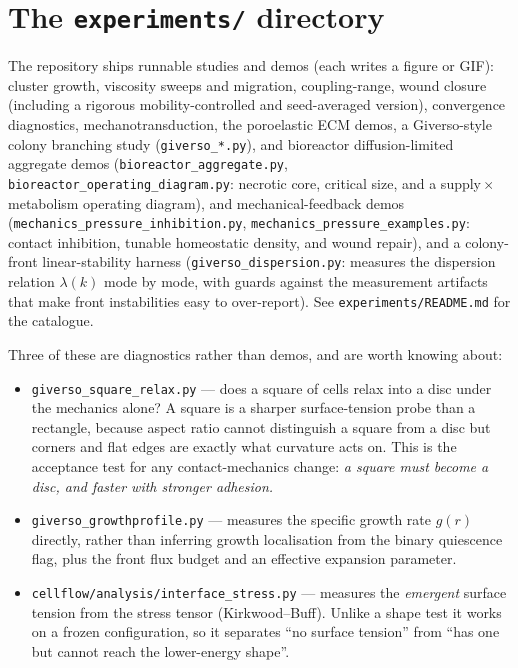 \documentclass[11pt]{article}
\newcommand{\code}[1]{\texttt{#1}}
\begin{document}
\section{The \texttt{experiments/} directory}
The repository ships runnable studies and demos (each writes a figure or GIF):
cluster growth, viscosity sweeps and migration, coupling-range, wound closure
(including a rigorous mobility-controlled and seed-averaged version),
convergence diagnostics, mechanotransduction, the poroelastic ECM demos, a
Giverso-style colony branching study (\code{giverso\_*.py}), and bioreactor
diffusion-limited aggregate demos (\code{bioreactor\_aggregate.py},
\code{bioreactor\_operating\_diagram.py}: necrotic core, critical size, and a
supply\,$\times$\,metabolism operating diagram), and mechanical-feedback demos
(\code{mechanics\_pressure\_inhibition.py}, \code{mechanics\_pressure\_examples.py}:
contact inhibition, tunable homeostatic density, and wound repair), and a
colony-front linear-stability harness (\code{giverso\_dispersion.py}: measures the
dispersion relation $\lambda(k)$ mode by mode, with guards against the
measurement artifacts that make front instabilities easy to over-report). See
\code{experiments/README.md} for the catalogue.

Three of these are diagnostics rather than demos, and are worth knowing about:
\begin{itemize}
  \item \code{giverso\_square\_relax.py} --- does a square of cells relax into a
        disc under the mechanics alone? A square is a sharper surface-tension
        probe than a rectangle, because aspect ratio cannot distinguish a square
        from a disc but corners and flat edges are exactly what curvature acts
        on. This is the acceptance test for any contact-mechanics change:
        \emph{a square must become a disc, and faster with stronger adhesion.}
  \item \code{giverso\_growthprofile.py} --- measures the specific growth rate
        $g(r)$ directly, rather than inferring growth localisation from the
        binary quiescence flag, plus the front flux budget and an effective
        expansion parameter.
  \item \code{cellflow/analysis/interface\_stress.py} --- measures the
        \emph{emergent} surface tension from the stress tensor (Kirkwood--Buff).
        Unlike a shape test it works on a frozen configuration, so it separates
        ``no surface tension'' from ``has one but cannot reach the lower-energy
        shape''.
\end{itemize}
\end{document}
